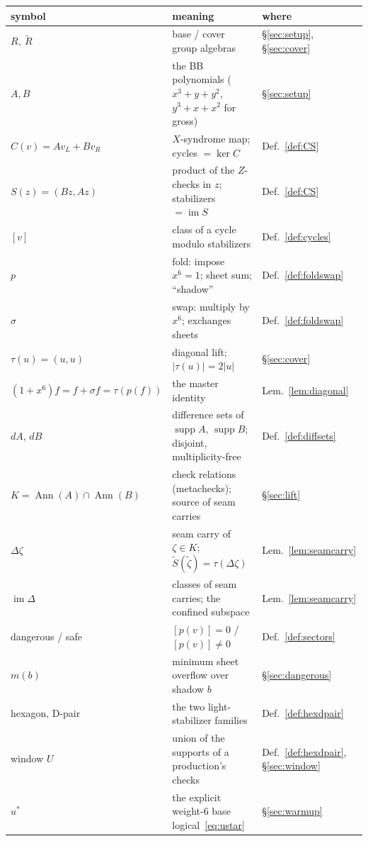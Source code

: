 \documentclass[11pt]{article}
\theoremstyle{plain}
\theoremstyle{definition}
\theoremstyle{remark}
\newcommand{\suppop}{\operatorname{supp}}
\newcommand{\Ann}{\operatorname{Ann}}
\newcommand{\imD}{\operatorname{im}\Delta}
\newcommand{\Rbase}{R}
\newcommand{\Rcov}{\widetilde{R}}
\newcommand{\wt}[1]{\lvert #1\rvert}
\begin{document}
\begin{center}
\footnotesize
\begin{tabular}{lll}
\toprule
symbol & meaning & where\\
\midrule
$\Rbase,\ \Rcov$ & base / cover group algebras & \S\ref{sec:setup},
\S\ref{sec:cover}\\
$A, B$ & the BB polynomials ($x^3{+}y{+}y^2$,\ $y^3{+}x{+}x^2$ for gross) &
\S\ref{sec:setup}\\
$C(v) = Av_L + Bv_R$ & $X$-syndrome map; cycles $= \ker C$ &
Def.~\ref{def:CS}\\
$S(z) = (Bz, Az)$ & product of the $Z$-checks in $z$; stabilizers $=
\operatorname{im} S$ & Def.~\ref{def:CS}\\
$[v]$ & class of a cycle modulo stabilizers & Def.~\ref{def:cycles}\\
$p$ & fold: impose $x^6 = 1$; sheet sum; ``shadow'' &
Def.~\ref{def:foldswap}\\
$\sigma$ & swap: multiply by $x^6$; exchanges sheets &
Def.~\ref{def:foldswap}\\
$\tau(u) = (u,u)$ & diagonal lift; $\wt{\tau(u)} = 2\wt{u}$ &
\S\ref{sec:cover}\\
$(1+x^6)f = f + \sigma f = \tau(p(f))$ & the master identity &
Lem.~\ref{lem:diagonal}\\
$dA$, $dB$ & difference sets of $\suppop A$, $\suppop B$; disjoint,
multiplicity-free & Def.~\ref{def:diffsets}\\
$K = \Ann(A) \cap \Ann(B)$ & check relations (metachecks); source of seam
carries & \S\ref{sec:lift}\\
$\Delta\zeta$ & seam carry of $\zeta \in K$; $\widetilde S(\widetilde\zeta) =
\tau(\Delta\zeta)$ & Lem.~\ref{lem:seamcarry}\\
$\imD$ & classes of seam carries; the confined subspace &
Lem.~\ref{lem:seamcarry}\\
dangerous / safe & $[p(v)] = 0$ / $[p(v)] \neq 0$ & Def.~\ref{def:sectors}\\
$m(b)$ & minimum sheet overflow over shadow $b$ & \S\ref{sec:dangerous}\\
hexagon, D-pair & the two light-stabilizer families &
Def.~\ref{def:hexdpair}\\
window $U$ & union of the supports of a production's checks &
Def.~\ref{def:hexdpair}, \S\ref{sec:window}\\
$u^*$ & the explicit weight-6 base logical~\eqref{eq:ustar} &
\S\ref{sec:warmup}\\
\bottomrule
\end{tabular}
\end{center}
\end{document}
